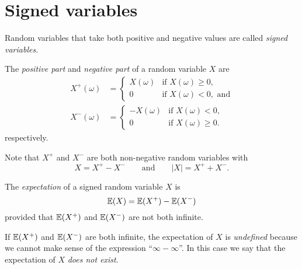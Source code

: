 
\section{Signed variables}\label{sec:}

Random variables that take both positive and negative values are called \emph{signed variables}. 

\begin{definition}
The \emph{positive part} and \emph{negative part} of a random variable $X$ are
\begin{align*}
X^{+}(\omega) 
	& = \begin{cases} 
			X(\omega)	& \text{if } X(\omega)\geq 0, \\
	   		0 		 	& \text{if } X(\omega) < 0, \text{ and}
	\end{cases} \\[2ex]
X^{-}(\omega)	
	& = \begin{cases} 
			-X(\omega)	& \text{if } X(\omega) < 0, \\
			0 		 	& \text{if } X(\omega) \geq 0.
		\end{cases}
\end{align*}
respectively. 
\end{definition}

Note that $X^{+}$ and $X^{-}$ are both non-negative random variables with
\[
X = X^{+} - X^{-}
\qquad\text{and}\qquad
|X| = X^{+} + X^{-}.
\]

\begin{definition}
The \emph{expectation} of a signed random variable $X$ is
\[
\mathbb{E}(X) = \mathbb{E}(X^{+}) - \mathbb{E}(X^{-})
\]
provided that $\mathbb{E}(X^{+})$ and $\mathbb{E}(X^{-})$ are not both infinite.
\end{definition}

\begin{remark}
If $\mathbb{E}(X^{+})$ and $\mathbb{E}(X^{-})$ are both infinite, the expectation of $X$ is \emph{undefined} because we cannot make sense of the expression ``$\infty - \infty$''. In this case we say that the expectation of $X$ \emph{does not exist}.
\end{remark}


